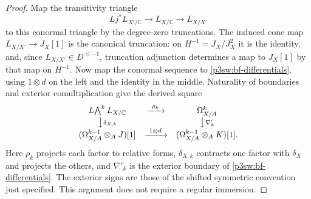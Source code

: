\documentclass[11pt]{article}
\newcommand{\C}{\mathbb C}
\numberwithin{equation}{section}
\begin{document}
\begin{proof}
Map the transitivity triangle
\[
 Lj^*L_{X'/\C}\longrightarrow L_{X/\C}\longrightarrow L_{X/X'}
\]
to this conormal triangle by the degree-zero truncations.
The induced cone map \(L_{X/X'}\to J_X[1]\) is the canonical
truncation: on \(H^{-1}=J_X/J_X^2\) it is the identity, and,
since \(L_{X/X'}\in D^{\leq-1}\), truncation adjunction
determines a map to \(J_X[1]\) by that map on \(H^{-1}\).
Now map the conormal sequence to
\eqref{p3sw:bf-differentials}, using \(1\otimes d\) on the
left and the identity in the middle.  Naturality of boundaries
and exterior comultiplication give the derived square
\begin{equation}
\label{p3sw:bf-conormal-square}
\begin{array}{ccc}
 L\!\bigwedge^k L_{X/\C}&\xrightarrow{\ \rho_k\ }&\Omega^k_{X/A}\\
 \big\downarrow{\scriptstyle\delta_{X,k}}&&
        \big\downarrow{\scriptstyle\nabla'_k}\\
 (\Omega^{k-1}_{X/A}\otimes_AJ)[1]&
        \xrightarrow{\ 1\otimes d\ }&
        (\Omega^{k-1}_{X/A}\otimes_AK)[1].
\end{array}
\end{equation}
Here \(\rho_k\) projects each factor to relative forms,
\(\delta_{X,k}\) contracts one factor with \(\delta_X\) and
projects the others, and \(\nabla'_k\) is the exterior boundary
of \eqref{p3sw:bf-differentials}.  The exterior signs are those
of the shifted symmetric convention just specified.  This
argument does not require a regular immersion.


\end{proof}
\end{document}
